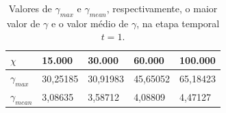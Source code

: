 \begin{table}[!ht]
\begin{center}
\begin{tabular}{|l|l|l|l|l|} %
\hline
$\chi$ & 15.000 & 30.000 & 60.000 & 100.000 \\
\hline %
 $\gamma_{max}$    & 30,25185 & 30,91983 & 45,65052 &  65,18423\\
 $\gamma_{mean}$   & 3,08635 & 3,58712 & 4,08809 &  4,47127\\
\hline %
\end{tabular}%
\end{center}
\caption{Valores de $\gamma_{max}$ e $\gamma_{mean}$, respectivamente, o maior valor de $\gamma$ e o valor médio de $\gamma$, na etapa temporal $t=1$.} %
\label{tabela_malha_inicial}
\end{table}

